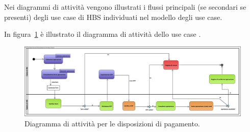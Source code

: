 
Nei diagrammi di attività vengono illustrati i flussi principali (se secondari se presenti) degli use case di HBS individuati nel modello degli use case.

In figura~\ref{fig:activity:disposizione-pagamento} è illustrato il diagramma di attività dello use case \iducDISPAG.

\begin{figure}[h]
	\centering
	\includegraphics[width=\textheight, angle=90]{Images/activity/Disposizione_Pagamento.eps}
	\caption{Diagramma di attività per le disposizioni di pagamento.}
	\label{fig:activity:disposizione-pagamento}
\end{figure}
